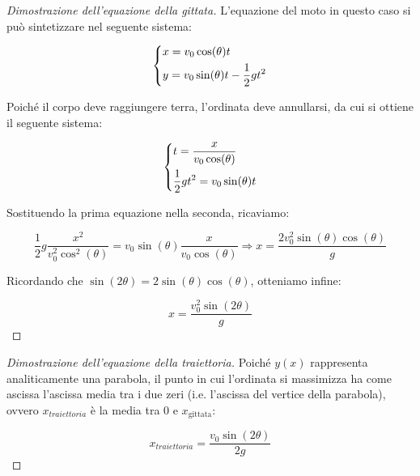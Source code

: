 \begin{proof}[Dimostrazione dell'equazione della gittata]
    L'equazione del moto in questo caso si può sintetizzare nel
    seguente sistema:

    \begin{equation*}
        \begin{dcases}
            x=v_0\cos(\theta)t  \\
            y=v_0\sin(\theta)t -\frac12gt^2
        \end{dcases}
    \end{equation*}

    Poiché il corpo deve raggiungere terra, l'ordinata deve
    annullarsi, da cui si ottiene il seguente sistema:

    \begin{equation*}
        \begin{dcases}
            t=\frac{x}{v_0\cos(\theta)} \\
            \frac12gt^2=v_0\sin(\theta)t 
        \end{dcases}
    \end{equation*}

    Sostituendo la prima equazione nella seconda, ricaviamo:

    \begin{equation*}
        \frac12 g \frac{x^2}{v_0^2 \cos^2(\theta)}=v_0\sin(\theta) \frac{x}{v_0\cos(\theta)} \Rightarrow x=\frac{2 v_0^2 \sin(\theta) \cos(\theta)}{g}
    \end{equation*}

    Ricordando che $\sin(2\theta)=2\sin(\theta)\cos(\theta)$, otteniamo infine:

    \begin{equation*}
        x=\frac{v_0^2 \sin(2\theta)}{g}
    \end{equation*}
\end{proof}

\begin{proof}[Dimostrazione dell'equazione della traiettoria]
    Poiché $y(x)$ rappresenta analiticamente una parabola, il punto in cui
    l'ordinata si massimizza ha come ascissa
    l'ascissa media tra i due zeri (i.e. l'ascissa del vertice della
    parabola), ovvero $x_{traiettoria}$ è la media tra $0$ e
    $x_{\text{gittata}}$:

    \begin{equation*}
        x_{traiettoria}=\frac{v_0\sin(2\theta)}{2g}
    \end{equation*}
\end{proof}

